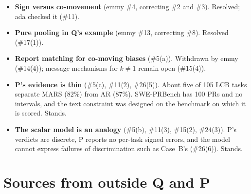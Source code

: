\documentclass{article}
\begin{document}
\begin{itemize}
{rule} (ada \#9). Single-reviewer and Two-reviewers edit once and MARS is
capped at two rounds, while AR re-edits until R and C converge at once
and find no flaws (P lines 203--205). P states no outer cap for LCB, and
its SWE-bench workflow caps the outer loop at two (P lines 1884, 1892).
The LCB gain may therefore come from the stricter acceptance rule and the
extra edits rather than from R-C interaction. emmy confirmed this from
P's text and found that P's generic AR skill allows seven inner rounds,
against five in P Sec.~3.5 (\#13, P lines 199, 1689); ada confirmed it
(\#17(1)). Open: which caps ran on LCB, and the separating run.
\item \textbf{Sign versus co-movement} (emmy \#4, correcting \#2 and \#3).
Resolved; ada checked it (\#11).
\item \textbf{Pure pooling in Q's example} (emmy \#13, correcting \#8).
Resolved (\#17(1)).
\item \textbf{Report matching for co-moving biases} (\#5(a)). Withdrawn
by emmy (\#14(4)); message mechanisms for $k\ne1$ remain open (\#15(4)).
\item \textbf{P's evidence is thin} (\#5(c), \#11(2), \#26(5)). About five
of 105 LCB tasks separate MARS ($82\%$) from AR ($87\%$). SWE-PRBench has
100 PRs and no intervals, and the text constraint was designed on the
benchmark on which it is scored. Stands.
\item \textbf{The scalar model is an analogy} (\#5(b), \#11(3), \#15(2),
\#24(3)). P's verdicts are discrete, P reports no per-task signed errors,
and the model cannot express failures of discrimination such as Case~B's
(\#26(6)). Stands.
\end{itemize}

\section{Sources from outside Q and P}
\end{document}
